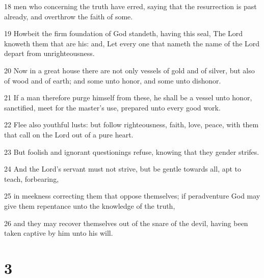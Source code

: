 \par 18 men who concerning the truth have erred, saying that the resurrection is past already, and overthrow the faith of some.
\par 19 Howbeit the firm foundation of God standeth, having this seal, The Lord knoweth them that are his: and, Let every one that nameth the name of the Lord depart from unrighteousness.
\par 20 Now in a great house there are not only vessels of gold and of silver, but also of wood and of earth; and some unto honor, and some unto dishonor.
\par 21 If a man therefore purge himself from these, he shall be a vessel unto honor, sanctified, meet for the master's use, prepared unto every good work.
\par 22 Flee also youthful lusts: but follow righteousness, faith, love, peace, with them that call on the Lord out of a pure heart.
\par 23 But foolish and ignorant questionings refuse, knowing that they gender strifes.
\par 24 And the Lord's servant must not strive, but be gentle towards all, apt to teach, forbearing,
\par 25 in meekness correcting them that oppose themselves; if peradventure God may give them repentance unto the knowledge of the truth,
\par 26 and they may recover themselves out of the snare of the devil, having been taken captive by him unto his will.

\chapter{3}

